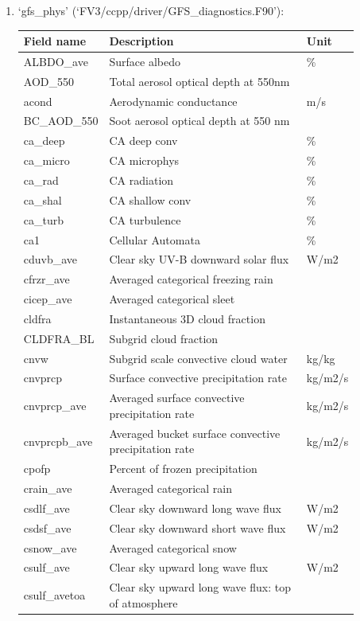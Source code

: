 \documentclass[11pt,fleqn]{report}              %
\begin{document}
\begin{enumerate}
\begin{enumerate}
\item `gfs\_phys' (`FV3/ccpp/driver/GFS\_diagnostics.F90'):
{
\scriptsize
\begin{longtable}{p{0.17\linewidth} | p{0.6\linewidth} | p{0.11\linewidth} }
\hline
\hline
Field name & Description & Unit \\
\hline
ALBDO\_ave & Surface albedo & \%  \\
AOD\_550 & Total aerosol optical depth at 550nm & \\
acond  & Aerodynamic conductance & m/s \\
BC\_AOD\_550  & Soot aerosol optical depth at 550 nm & \\
ca\_deep & CA deep conv & \%  \\
ca\_micro  & CA microphys & \%  \\
ca\_rad  & CA radiation & \%  \\
ca\_shal  & CA shallow conv & \%  \\
ca\_turb  & CA turbulence & \%  \\
ca1 & Cellular Automata & \%  \\
cduvb\_ave  & Clear sky UV-B downward solar flux & W/m2  \\
cfrzr\_ave & Averaged categorical freezing rain & \\
cicep\_ave  & Averaged categorical sleet & \\
cldfra  & Instantaneous 3D cloud fraction & \\
CLDFRA\_BL  & Subgrid cloud fraction & \\
cnvw  & Subgrid scale convective cloud water & kg/kg  \\
cnvprcp  & Surface convective precipitation rate & kg/m2/s \\
cnvprcp\_ave  & Averaged surface convective precipitation rate & kg/m2/s  \\
cnvprcpb\_ave & Averaged bucket surface convective precipitation rate & kg/m2/s  \\
cpofp  & Percent of frozen precipitation &  \\
crain\_ave  & Averaged categorical rain & \\
csdlf\_ave  & Clear sky downward long wave flux & W/m2  \\
csdsf\_ave & Clear sky downward short wave flux & W/m2  \\
csnow\_ave  & Averaged categorical snow  & \\
csulf\_ave  & Clear sky upward long wave flux & W/m2  \\
csulf\_avetoa  & Clear sky upward long wave flux: top of atmosphere & \\

\end{longtable}}
\end{enumerate}
\end{enumerate}
\end{document}
